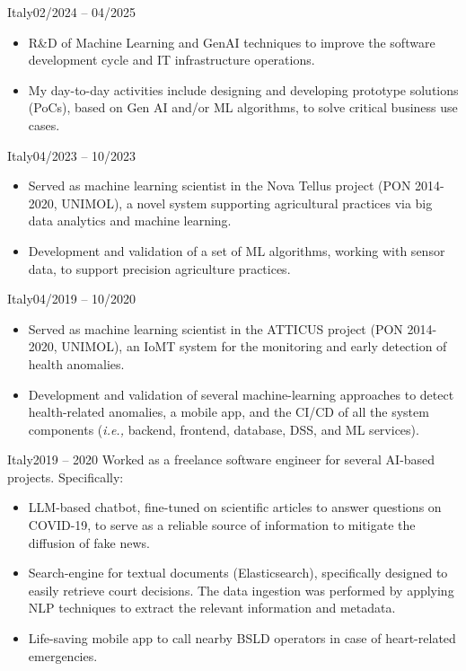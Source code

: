 
	{Italy}{02/2024 – 04/2025}
	\begin{itemize}
		\item R\&D of Machine Learning and GenAI techniques to improve the software development cycle and IT infrastructure operations.
		\item My day-to-day activities include designing and developing prototype solutions (PoCs), based on Gen AI and/or ML algorithms, to solve critical business use cases.
	\end{itemize}
		
	\medskip

	{Italy}{04/2023 – 10/2023}
	\begin{itemize}
            \item Served as machine learning scientist in the Nova Tellus project (PON 2014-2020, UNIMOL), a novel system supporting agricultural practices via big data analytics and machine learning.
            \item Development and validation of a set of ML algorithms, working with sensor data, to support precision agriculture practices.
	\end{itemize}
	
	\medskip
	
	{Italy}{04/2019 – 10/2020}
	\begin{itemize}
		\item Served as machine learning scientist in the ATTICUS project (PON 2014-2020, UNIMOL), an IoMT system for the monitoring and early detection of health anomalies.
		\item Development and validation of several machine-learning approaches to detect health-related anomalies, a mobile app, and the CI/CD of all the system components (\emph{i.e.,} backend, frontend, database, DSS, and ML services).
	\end{itemize}

	\medskip

	{Italy}{2019 – 2020}
	Worked as a freelance software engineer for several AI-based projects. Specifically:

	\begin{itemize}

		\item LLM-based chatbot, fine-tuned on scientific articles to answer questions on COVID-19, to serve as a reliable source of information to mitigate the diffusion of fake news.
		
		\item Search-engine for textual documents (Elasticsearch), specifically designed to easily retrieve court decisions. The data ingestion was performed by applying NLP techniques to extract the relevant information and metadata.
		
		\item Life-saving mobile app to call nearby BSLD operators in case of heart-related emergencies.
		
	\end{itemize}
